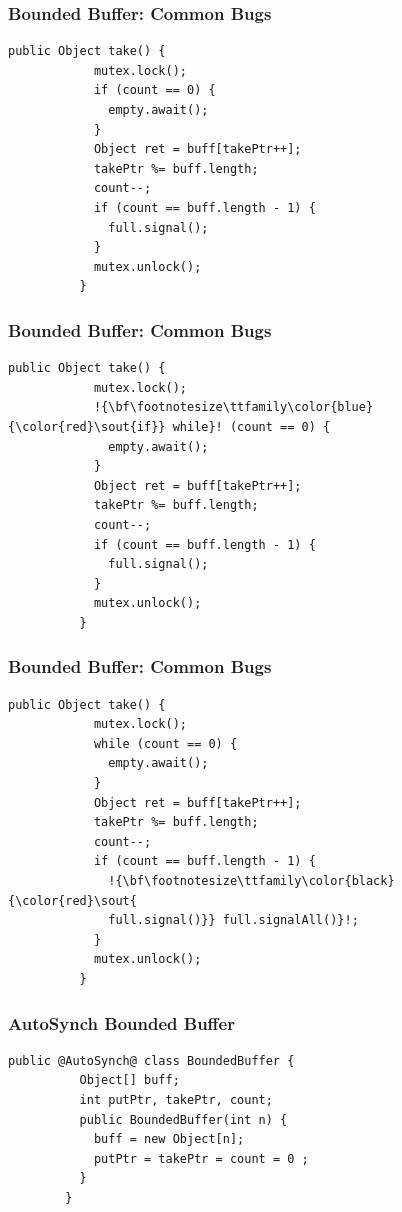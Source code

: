 \documentclass[mathserif,14pt,xcolor=table]{beamer}
\begin{document}
\begin{frame}[fragile]
    \frametitle{Bounded Buffer: Common Bugs}
    \begin{lstlisting}[style=base]
          public Object take() {
            mutex.lock();
            if (count == 0) {
              empty.await();
            }
            Object ret = buff[takePtr++];
            takePtr %= buff.length;
            count--;
            if (count == buff.length - 1) {
              full.signal();
            }
            mutex.unlock();
          }
    \end{lstlisting}
\end{frame}

\begin{frame}[fragile]
    \frametitle{Bounded Buffer: Common Bugs}
    \begin{lstlisting}[style=base, escapechar=!]
          public Object take() {
            mutex.lock();
            !{\bf\footnotesize\ttfamily\color{blue}{\color{red}\sout{if}} while}! (count == 0) {
              empty.await();
            }
            Object ret = buff[takePtr++];
            takePtr %= buff.length;
            count--;
            if (count == buff.length - 1) {
              full.signal();
            }
            mutex.unlock();
          }
    \end{lstlisting}
\end{frame}

\begin{frame}[fragile]
    \frametitle{Bounded Buffer: Common Bugs}
    \begin{lstlisting}[style=base, escapechar=!]
          public Object take() {
            mutex.lock();
            while (count == 0) {
              empty.await();
            }
            Object ret = buff[takePtr++];
            takePtr %= buff.length;
            count--;
            if (count == buff.length - 1) {
              !{\bf\footnotesize\ttfamily\color{black}{\color{red}\sout{
              full.signal()}} full.signalAll()}!;
            }
            mutex.unlock();
          }
    \end{lstlisting}
\end{frame}

\begin{frame}[fragile]
    \frametitle{AutoSynch Bounded Buffer}
    \begin{lstlisting}[style=base]
        public @AutoSynch@ class BoundedBuffer {
          Object[] buff;
          int putPtr, takePtr, count;
          public BoundedBuffer(int n) {
            buff = new Object[n];
            putPtr = takePtr = count = 0 ;
          }
        }
    \end{lstlisting}
\end{frame}
\end{document}
